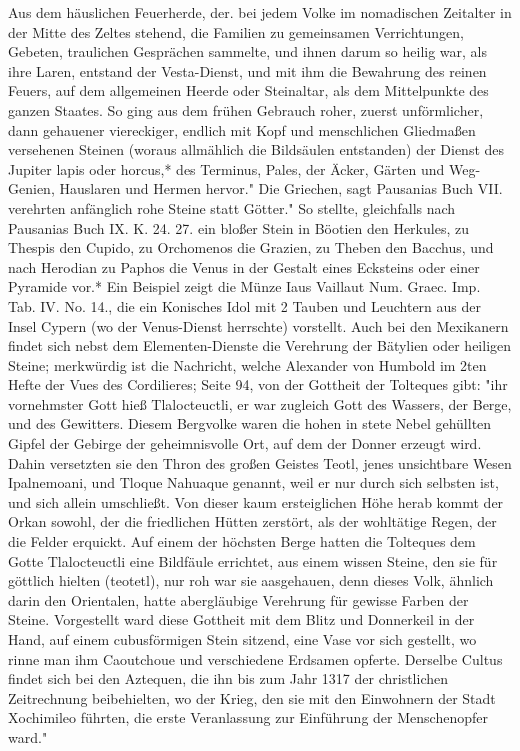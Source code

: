 \documentclass[a4paper, 11pt, oneside, polutonikogreek, german]{article}
\begin{document}
Aus dem häuslichen Feuerherde, der. bei jedem Volke im nomadischen Zeitalter in der Mitte des Zeltes stehend, die Familien zu gemeinsamen Verrichtungen, Gebeten, traulichen Gesprächen sammelte, und ihnen darum so heilig war, als ihre Laren, entstand der Vesta-Dienst, und mit ihm die Bewahrung des reinen Feuers, auf dem allgemeinen Heerde oder Steinaltar, als dem Mittelpunkte des ganzen Staates. So ging aus dem frühen Gebrauch roher, zuerst unförmlicher, dann gehauener viereckiger, endlich mit Kopf und menschlichen Gliedmaßen versehenen Steinen (woraus allmählich die Bildsäulen entstanden) der Dienst des Jupiter lapis oder horcus,* des Terminus, Pales, der Äcker, Gärten und Weg- Genien, Hauslaren und Hermen hervor." Die Griechen, sagt Pausanias Buch VII. verehrten anfänglich rohe Steine statt Götter." So stellte, gleichfalls nach Pausanias Buch IX. K. 24. 27. ein bloßer Stein in Böotien den Herkules, zu Thespis den Cupido, zu Orchomenos die Grazien, zu Theben den Bacchus, und nach Herodian zu Paphos die Venus in der Gestalt eines Ecksteins oder einer Pyramide vor.* Ein Beispiel zeigt die Münze Iaus Vaillaut Num. Graec. Imp. Tab. IV. No. 14., die ein Konisches Idol mit 2 Tauben und Leuchtern aus der Insel Cypern (wo der Venus-Dienst herrschte) vorstellt. Auch bei den Mexikanern findet sich nebst dem Elementen-Dienste die Verehrung der Bätylien oder heiligen Steine; merkwürdig ist die Nachricht, welche Alexander von Humbold im 2ten Hefte der Vues des Cordilieres; Seite 94, von der Gottheit der Tolteques gibt: "ihr vornehmster Gott hieß Tlalocteuctli, er war zugleich Gott des Wassers, der Berge, und des Gewitters. Diesem Bergvolke waren die hohen in stete Nebel gehüllten Gipfel der Gebirge der geheimnisvolle Ort, auf dem der Donner erzeugt wird. Dahin versetzten sie den Thron des großen Geistes Teotl, jenes unsichtbare Wesen Ipalnemoani, und Tloque Nahuaque genannt, weil er nur durch sich selbsten ist, und sich allein umschließt. Von dieser kaum ersteiglichen Höhe herab kommt der Orkan sowohl, der die friedlichen Hütten zerstört, als der wohltätige Regen, der die Felder erquickt. Auf einem der höchsten Berge hatten die Tolteques dem Gotte Tlalocteuctli eine Bildfäule errichtet, aus einem wissen Steine, den sie für göttlich hielten (teotetl), nur roh war sie aasgehauen, denn dieses Volk, ähnlich darin den Orientalen, hatte abergläubige Verehrung für gewisse Farben der Steine. Vorgestellt ward diese Gottheit mit dem Blitz und Donnerkeil in der Hand, auf einem cubusförmigen Stein sitzend, eine Vase vor sich gestellt, wo rinne man ihm Caoutchoue und verschiedene Erdsamen opferte. Derselbe Cultus findet sich bei den Aztequen, die ihn bis zum Jahr 1317 der christlichen Zeitrechnung beibehielten, wo der Krieg, den sie mit den Einwohnern der Stadt Xochimileo führten, die erste Veranlassung zur Einführung der Menschenopfer ward."
\end{document}
